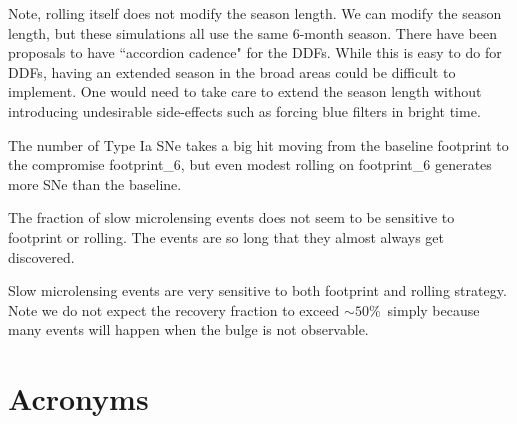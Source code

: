 \documentclass[modern]{aastex62}
\begin{document}
Note, rolling itself does not modify the season length.  We can modify the season length, but these simulations all use the same 6-month season. There have been proposals to have ``accordion cadence" for the DDFs. While this is easy to do for DDFs, having an extended season in the broad areas could be difficult to implement. One would need to take care to extend the season length without introducing undesirable side-effects such as forcing blue filters in bright time.


The number of Type Ia SNe takes a big hit moving from the baseline footprint to the compromise footprint\_6, but even modest rolling on footprint\_6 generates more SNe than the baseline. 

The fraction of slow microlensing events does not seem to be sensitive to footprint or rolling. The events are so long that they almost always get discovered.

Slow microlensing events are very sensitive to both footprint and rolling strategy. Note we do not expect the recovery fraction to exceed $\sim50\%$\ simply because many events will happen when the bulge is not observable. 






\section{Acronyms} \label{sec:acronyms}

\end{document}
